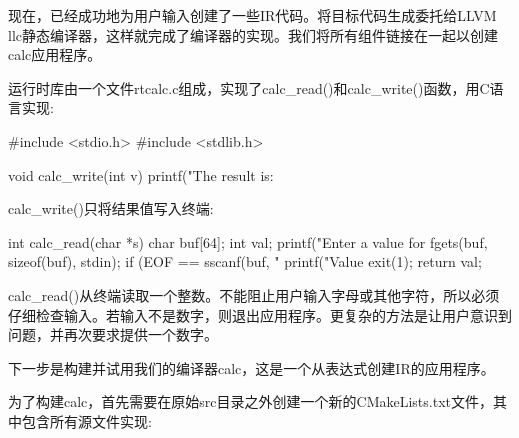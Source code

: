 现在，已经成功地为用户输入创建了一些IR代码。将目标代码生成委托给LLVM llc静态编译器，这样就完成了编译器的实现。我们将所有组件链接在一起以创建calc应用程序。

运行时库由一个文件rtcalc.c组成，实现了calc\_read()和calc\_write()函数，用C语言实现:

\begin{cpp}
#include <stdio.h>
#include <stdlib.h>

void calc_write(int v)
{
    printf("The result is: %
}
\end{cpp}

calc\_write()只将结果值写入终端:

\begin{cpp}
int calc_read(char *s)
{
    char buf[64];
    int val;
    printf("Enter a value for %
    fgets(buf, sizeof(buf), stdin);
    if (EOF == sscanf(buf, "%
    {
        printf("Value %
        exit(1);
    }
    return val;
}
\end{cpp}

calc\_read()从终端读取一个整数。不能阻止用户输入字母或其他字符，所以必须仔细检查输入。若输入不是数字，则退出应用程序。更复杂的方法是让用户意识到问题，并再次要求提供一个数字。

下一步是构建并试用我们的编译器calc，这是一个从表达式创建IR的应用程序。


为了构建calc，首先需要在原始src目录之外创建一个新的CMakeLists.txt文件，其中包含所有源文件实现:

